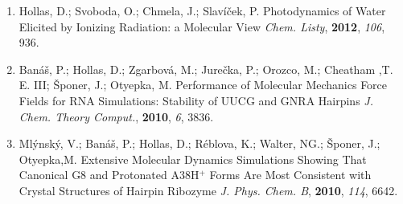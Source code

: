 \documentclass[a4paper,10pt]{article}
\begin{document}
\begin{enumerate}[(1)]
\item Hollas, D.; Svoboda, O.; Chmela, J.; Slavíček, P. Photodynamics of Water Elicited by Ionizing Radiation: a Molecular View \textit{Chem. Listy}, \textbf{2012}, \textit{106}, 936.

\item Banáš, P.; Hollas, D.; Zgarbová, M.; Jurečka, P.; Orozco, M.; Cheatham ,T. E. III; Šponer, J.; Otyepka, M. Performance of Molecular Mechanics Force Fields for RNA Simulations: Stability of UUCG and GNRA Hairpins \textit{J. Chem. Theory Comput.}, \textbf{2010}, \textit{6}, 3836.

\item Mlýnský, V.; Banáš, P.; Hollas, D.; Réblova, K.; Walter, NG.; Šponer, J.; Otyepka,M. Extensive Molecular Dynamics Simulations Showing That Canonical G8 and Protonated A38H$^{+}$ Forms Are Most Consistent with Crystal Structures of Hairpin Ribozyme \textit{J. Phys.  Chem. B}, \textbf{2010}, \textit{114}, 6642.

 
\end{enumerate} 
 
\end{document}
